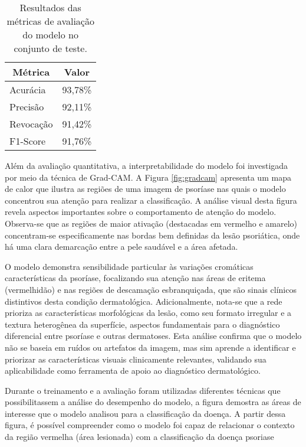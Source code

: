 \begin{table}[h]
  \centering
  \begin{tabular}{|l|c|}
  \hline
  \multicolumn{1}{|c|}{\textbf{Métrica}} & \textbf{Valor} \\ \hline
  Acurácia                               & 93,78\%           \\ \hline
  Precisão                               & 92,11\%           \\ \hline
  Revocação                              & 91,42\%           \\ \hline
  F1-Score                               & 91,76\%           \\ \hline
  \end{tabular}
  \caption{Resultados das métricas de avaliação do modelo no conjunto de teste.}
  \label{tab: resultados_metricas}
\end{table}

Além da avaliação quantitativa, a interpretabilidade do modelo foi investigada por meio da técnica de Grad-CAM. A Figura \ref{fig:gradcam} apresenta um mapa de calor que ilustra as regiões de uma imagem de psoríase nas quais o modelo concentrou sua atenção para realizar a classificação. 
A análise visual desta figura revela aspectos importantes sobre o comportamento de atenção do modelo. Observa-se que as regiões de maior ativação (destacadas em vermelho e amarelo) concentram-se especificamente nas bordas bem definidas da lesão psoriática, onde há uma clara demarcação entre a pele saudável e a área afetada. 

O modelo demonstra sensibilidade particular às variações cromáticas características da psoríase, focalizando sua atenção nas áreas de eritema (vermelhidão) e nas regiões de descamação esbranquiçada, que são sinais clínicos distintivos desta condição dermatológica. Adicionalmente, nota-se que a rede prioriza as características morfológicas da lesão, como seu formato irregular e a textura heterogênea da superfície, aspectos fundamentais para o diagnóstico diferencial entre psoríase e outras dermatoses. Esta análise confirma que o modelo não se baseia em ruídos ou artefatos da imagem, mas sim aprende a identificar e priorizar as características visuais clinicamente relevantes, validando sua aplicabilidade como ferramenta de apoio ao diagnóstico dermatológico.

Durante o treinamento e a avaliação foram utilizadas diferentes técnicas que possibilitassem a análise do desempenho do modelo, a figura demostra as áreas de interesse que o modelo analisou para a classificação da doença. A partir dessa figura, é possível compreender como o modelo foi capaz de relacionar o contexto da região vermelha (área lesionada) com a classificação da doença psoriase



